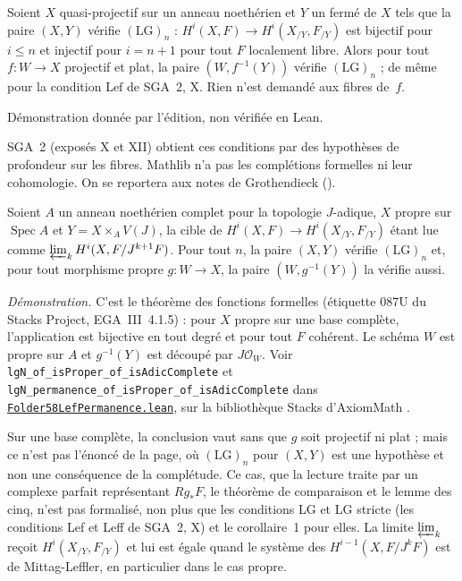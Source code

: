 \begin{encadre}
\begin{theoreme*}\nonverifie
Soient $X$ quasi-projectif sur un anneau noethérien et $Y$ un fermé de $X$ tels que la paire $(X, Y)$ vérifie $(\mathrm{LG})_n$ : $H^i(X, F) \to H^i(X_{/Y}, F_{/Y})$ est bijectif pour $i \leq n$ et injectif pour $i = n+1$ pour tout $F$ localement libre. Alors pour tout $f : W \to X$ projectif et plat, la paire $(W, f^{-1}(Y))$ vérifie $(\mathrm{LG})_n$ ; de même pour la condition $\mathrm{Lef}$ de SGA~2, X. Rien n'est demandé aux fibres de~$f$.
\end{theoreme*}
\end{encadre}
{\small Démonstration donnée par l'édition, non vérifiée en Lean.\par}
{\small SGA~2 (exposés X et XII) obtient ces conditions par des hypothèses de profondeur sur les fibres. Mathlib n'a pas les complétions formelles ni leur cohomologie. On se reportera aux notes de Grothendieck ().\par}

\begin{encadre}
\begin{theoreme*}
Soient $A$ un anneau noethérien complet pour la topologie $J$-adique, $X$ propre sur $\operatorname{Spec} A$ et $Y = X \times_A V(J)$, la cible de $H^i(X, F) \to H^i(X_{/Y}, F_{/Y})$ étant lue comme $\varprojlim_k H^i(X, F/J^{k+1}F)$. Pour tout $n$, la paire $(X, Y)$ vérifie $(\mathrm{LG})_n$ et, pour tout morphisme propre $g : W \to X$, la paire $(W, g^{-1}(Y))$ la vérifie aussi.
\end{theoreme*}
\end{encadre}
{\small \emph{Démonstration.} C'est le théorème des fonctions formelles (étiquette 087U du Stacks Project, EGA~III~4.1.5) : pour $X$ propre sur une base complète, l'application est bijective en tout degré et pour tout $F$ cohérent. Le schéma $W$ est propre sur $A$ et $g^{-1}(Y)$ est découpé par $J\mathcal O_W$. Voir \texttt{lgN\_of\_isProper\_of\_isAdicComplete} et \texttt{lgN\_permanence\_of\_isProper\_of\_isAdicComplete} dans \href{\leanblobmain/AlgebraicGeometry/Folder58LefPermanence.lean}{\texttt{Folder58LefPermanence.\allowbreak{}lean}}, sur la bibliothèque Stacks d'AxiomMath \cite{axiomstacks}.

Sur une base complète, la conclusion vaut sans que $g$ soit projectif ni plat ; mais ce n'est pas l'énoncé de la page, où $(\mathrm{LG})_n$ pour $(X, Y)$ est une hypothèse et non une conséquence de la complétude. Ce cas, que la lecture traite par un complexe parfait représentant $Rg_*F$, le théorème de comparaison et le lemme des cinq, n'est pas formalisé, non plus que les conditions LG et LG stricte (les conditions Lef et Leff de SGA~2, X) et le corollaire~1 pour elles. La limite $\varprojlim_k$ reçoit $H^i(X_{/Y}, F_{/Y})$ et lui est égale quand le système des $H^{i-1}(X, F/J^kF)$ est de Mittag-Leffler, en particulier dans le cas propre.\par}


